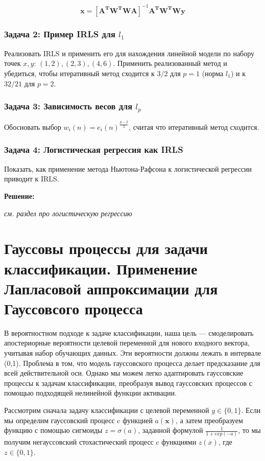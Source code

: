 {\[
    \boldsymbol{x} = \left[ \boldsymbol{A^T W^T W A} \right]^{-1} \boldsymbol{A^T W^T W y}
\]

\subsubsection{Задача 2: Пример IRLS для $l_1$}

Реализовать IRLS и применить его для нахождения линейной модели по набору точек $x, y$: $(1, 2), (2, 3), (4, 6)$. Применить реализованный метод и убедиться, чтобы итеративный метод сходится к $3 / 2$ для $p = 1$ (норма $l_1$) и к $32 / 21$ для $p = 2$.

\subsubsection{Задача 3: Зависимость весов для $l_p$}

Обосновать выбор $w_i(n) = e_i(n)^{\frac{p - 2}{2}}$, считая что итеративный метод сходится.

\subsubsection{Задача 4: Логистическая регрессия как IRLS}

Показать, как применение метода Ньютона-Рафсона к логистической регрессии приводит к IRLS.

\textbf{Решение:}

\textit{см. раздел про логистическую регрессию}

\section{Гауссовы процессы для задачи классификации. Применение Лапласовой аппроксимации для Гауссовсого процесса}

В вероятностном подходе к задаче классификации, наша цель — смоделировать апостериорные
вероятности целевой переменной для нового входного вектора, учитывая набор обучающих
данных. Эти вероятности должны лежать в интервале (0,1). Проблема в том, что модель гауссовского процесса делает предсказание для всей действительной оси. Однако мы можем легко
адаптировать гауссовские процессы к задачам классификации, преобразуя вывод
гауссовских процессов с помощью подходящей нелинейной функции активации.

Рассмотрим сначала задачу классификации с целевой переменной $y \in \{0,1\}$. Если мы определим гауссовский процесс c функцией $a(\mathbf{x})$, а затем преобразуем функцию с помощью сигмоиды $z=\sigma(a)$, заданной формулой $\frac{1}{1+exp(-a)}$, то мы получим негауссовский
стохастический процесс c функциями $z(x)$, где $z \in \{0,1\}$.

}
